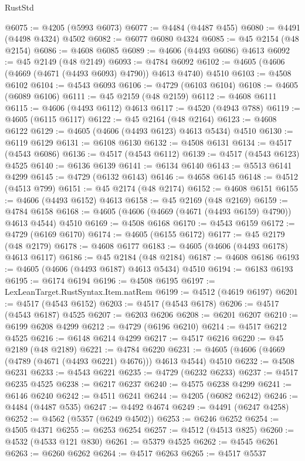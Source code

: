 \begin{lexlean}{RustStd}
\begin{coremodule}
@6075 := @4205 (@5993 @6073)
@6077 := @4484 (@4487 @455)
@6080 := @4491 (@4498 @4324) @4502
@6082 := @6077 @6080 @4324
@6085 := @45 @2154 (@48 @2154)
@6086 := @4608 @6085
@6089 := @4606 (@4493 @6086) @4613
@6092 := @45 @2149 (@48 @2149)
@6093 := @4784 @6092
@6102 := @4605 (@4606 (@4669 (@4671 (@4493 @6093) @4790)) @4613 @4740) @4510
@6103 := @4508 @6102
@6104 := @4543 @6093
@6106 := @4729 (@6103 @6104)
@6108 := @4605 (@6089 @6106)
@6111 := @45 @2159 (@48 @2159)
@6112 := @4608 @6111
@6115 := @4606 (@4493 @6112) @4613
@6117 := @4520 (@4943 @788)
@6119 := @4605 (@6115 @6117)
@6122 := @45 @2164 (@48 @2164)
@6123 := @4608 @6122
@6129 := @4605 (@4606 (@4493 @6123) @4613 @5434) @4510
@6130 := @6119 @6129
@6131 := @6108 @6130
@6132 := @4508 @6131
@6134 := @4517 (@4543 @6086)
@6136 := @4517 (@4543 @6112)
@6139 := @4517 (@4543 @6123) @4525
@6140 := @6136 @6139
@6141 := @6134 @6140
@6143 := @5513 @6141 @4299
@6145 := @4729 (@6132 @6143)
@6146 := @4658 @6145
@6148 := @4512 (@4513 @799)
@6151 := @45 @2174 (@48 @2174)
@6152 := @4608 @6151
@6155 := @4606 (@4493 @6152) @4613
@6158 := @45 @2169 (@48 @2169)
@6159 := @4784 @6158
@6168 := @4605 (@4606 (@4669 (@4671 (@4493 @6159) @4790)) @4613 @4544) @4510
@6169 := @4508 @6168
@6170 := @4543 @6159
@6172 := @4729 (@6169 @6170)
@6174 := @4605 (@6155 @6172)
@6177 := @45 @2179 (@48 @2179)
@6178 := @4608 @6177
@6183 := @4605 (@4606 (@4493 @6178) @4613 @6117)
@6186 := @45 @2184 (@48 @2184)
@6187 := @4608 @6186
@6193 := @4605 (@4606 (@4493 @6187) @4613 @5434) @4510
@6194 := @6183 @6193
@6195 := @6174 @6194
@6196 := @4508 @6195
@6197 := LexLeanTarget.RustSyntax.Item.natRem
@6199 := @4512 (@4619 @6197)
@6201 := @4517 (@4543 @6152)
@6203 := @4517 (@4543 @6178)
@6206 := @4517 (@4543 @6187) @4525
@6207 := @6203 @6206
@6208 := @6201 @6207
@6210 := @6199 @6208 @4299
@6212 := @4729 (@6196 @6210)
@6214 := @4517 @6212 @4525
@6216 := @6148 @6214 @4299
@6217 := @4517 @6216
@6220 := @45 @2189 (@48 @2189)
@6221 := @4784 @6220
@6231 := @4605 (@4606 (@4669 (@4789 (@4671 (@4493 @6221) @4676))) @4613 @4544) @4510
@6232 := @4508 @6231
@6233 := @4543 @6221
@6235 := @4729 (@6232 @6233)
@6237 := @4517 @6235 @4525
@6238 := @6217 @6237
@6240 := @4575 @6238 @4299
@6241 := @6146 @6240
@6242 := @4511 @6241
@6244 := @4205 (@6082 @6242)
@6246 := @4484 (@4487 @535)
@6247 := @4492 @4674
@6249 := @4491 (@6247 @4258)
@6252 := @4562 (@5357 (@6249 @4502))
@6253 := @6246 @6252
@6254 := @4505 @4371
@6255 := @6253 @6254
@6257 := @4512 (@4513 @825)
@6260 := @4532 (@4533 @121 @830)
@6261 := @5379 @4525
@6262 := @4545 @6261
@6263 := @6260 @6262
@6264 := @4517 @6263
@6265 := @4517 @5537

\end{coremodule}
\end{lexlean}
